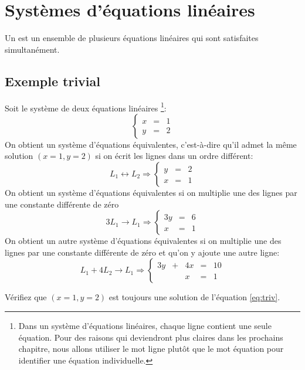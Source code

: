 \section{Systèmes d'équations linéaires}

Un  est un ensemble de plusieurs équations linéaires
qui sont satisfaites simultanément.

\subsection{Exemple trivial}
Soit le système de deux équations linéaires%
\footnote{Dans un système d'équations linéaires, chaque ligne contient une seule équation.
Pour des raisons qui deviendront plus claires dans les prochains chapitre, nous allons
utiliser le mot ligne plutôt que le mot équation pour identifier une équation individuelle.}:
\[
\left\{ \begin{matrix}
    x &=& 1 \\
    y &=& 2
    \end{matrix}
    \right.
\]
On obtient un système d'équations équivalentes, c'est-à-dire qu'il admet la même
solution $(x=1, y=2)$ si on écrit les
lignes dans un ordre différent:
\[
 L_1  \leftrightarrow L_2 \Rightarrow
\left\{ \begin{matrix}
    y &=& 2 \\
    x &=& 1
    \end{matrix}
    \right.
\]
On obtient un système d'équations équivalentes si on multiplie une des lignes par une constante différente
de zéro
\[
3L_1 \rightarrow L_1 \Rightarrow \left\{ \begin{matrix}
    3y &=& 6 \\
    x &=& 1
    \end{matrix}
    \right.
\]
On obtient un autre système d'équations équivalentes si on multiplie une des lignes par une constante différente
de zéro et qu'on y ajoute une autre ligne:
\begin{equation}\label{eq:triv}
L_1 + 4L_2 \rightarrow L_1 \Rightarrow \left\{ \begin{matrix}
    3y &+& 4x &=& 10 \\
    && x &=& 1
    \end{matrix}
    \right.
\end{equation}
\begin{exerciceB}
Vérifiez que $(x=1, y=2)$ est toujours une solution de l'équation \eqref{eq:triv}.
\end{exerciceB}
